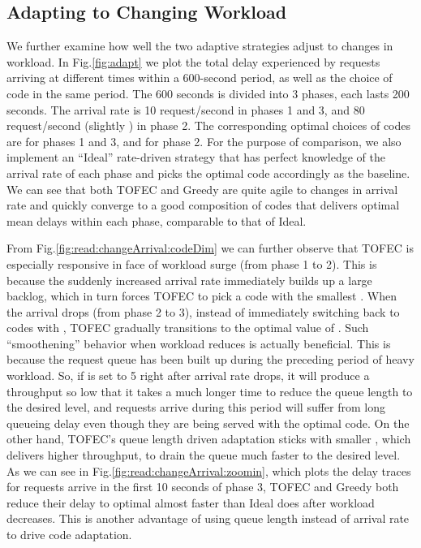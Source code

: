 \documentclass[journal]{IEEEtran}
\newcommand{\comment}[1]{}
\newcommand{\ourproposal}{TOFEC\xspace}
\newcommand{\onewidth}{0.74\columnwidth}
\begin{document}
\comment{
\begin{figure}[!t]
\centering
\texttt{[image: changeArrival]}
\caption{Adaptation to changing workload}
\label{fig:read:changeArrival}
\end{figure}
}

\subsection{Adapting to Changing Workload}
We further examine how well the two adaptive strategies adjust to changes in workload. 
In Fig.\ref{fig:adapt} we plot the total delay experienced by requests arriving at different times within a 600-second period, as well as the choice of code in the same period. The 600 seconds is divided into 3 phases, each lasts 200 seconds.
The arrival rate is 10 request/second in phases 1 and 3, and 80 request/second (slightly ) in phase 2. The corresponding optimal choices of codes  are  for phases 1 and 3, and  for phase 2. 
For the purpose of comparison, we also implement an ``Ideal'' rate-driven strategy that has perfect knowledge of the arrival rate of each phase and picks the optimal code accordingly as the baseline.
We can see that both \ourproposal and Greedy are quite agile to changes in arrival rate and quickly converge to a good composition of codes that delivers optimal mean delays within each phase,  comparable to that of Ideal.


From Fig.\ref{fig:read:changeArrival:codeDim} we can further observe that \ourproposal is especially responsive in face of workload surge (from phase 1 to 2). This is because the suddenly increased arrival rate immediately builds up a large backlog, which in turn forces \ourproposal to pick a code with the smallest . When the arrival drops (from phase 2 to 3), instead of immediately switching back to codes with , \ourproposal gradually transitions to the optimal value of . Such ``smoothening'' behavior when workload reduces is actually beneficial. This is because the request queue has been built up during the preceding period of heavy workload. So, if  is set to 5 right after arrival rate drops, it will produce a throughput so low that it takes a much longer time to reduce the queue length to the desired level, and requests arrive during this period will suffer from long queueing delay even though they are being served with the optimal code. On the other hand, \ourproposal's queue length driven adaptation sticks with smaller , which delivers higher throughput, to drain the queue much faster to the desired level.  As we can see in Fig.\ref{fig:read:changeArrival:zoomin}, which plots the delay traces for requests arrive in the first 10 seconds of phase 3, \ourproposal and Greedy both reduce their delay to optimal almost   faster than Ideal does after workload decreases. This is another advantage of using queue length instead of arrival rate to drive code adaptation.  
\end{document}
